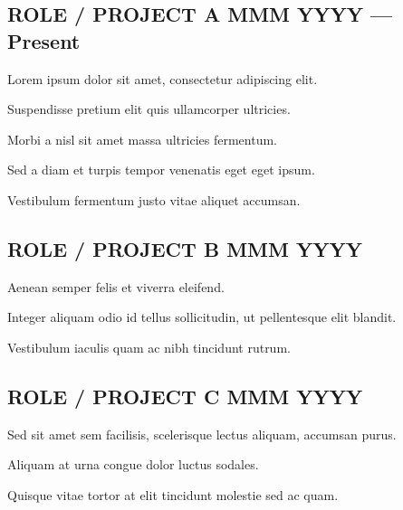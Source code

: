 \documentclass[letter,10pt]{article}
\begin{document}
\subsection{{ROLE / PROJECT A \hfill MMM YYYY --- Present}}
\begin{zitemize}
\item Lorem ipsum dolor sit amet, consectetur adipiscing elit.
\item Suspendisse pretium elit quis ullamcorper ultricies.
\item Morbi a nisl sit amet massa ultricies fermentum.
\item Sed a diam et turpis tempor venenatis eget eget ipsum.
\item Vestibulum fermentum justo vitae aliquet accumsan.
\end{zitemize}

\subsection{{ROLE / PROJECT B \hfill MMM YYYY}}
\begin{zitemize}
\item Aenean semper felis et viverra eleifend.
\item Integer aliquam odio id tellus sollicitudin, ut pellentesque elit blandit.
\item Vestibulum iaculis quam ac nibh tincidunt rutrum.
\end{zitemize}

\subsection{{ROLE / PROJECT C \hfill MMM YYYY}}
\begin{zitemize}
\item Sed sit amet sem facilisis, scelerisque lectus aliquam, accumsan purus.
\item Aliquam at urna congue dolor luctus sodales.
\item Quisque vitae tortor at elit tincidunt molestie sed ac quam.
\end{zitemize}
\end{document}
